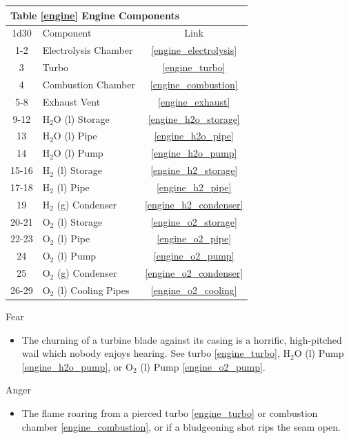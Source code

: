 \documentclass[a4paper]{article}
\begin{document}
\vspace{0.5cm} \hspace{0.25\linewidth}
\def\engine_components{
\begin{tabular}[t]{| c | l | c |}
\toprule
\multicolumn{3}{|l|}{Table \ref{engine} Engine Components} \\
\toprule
1d30 & Component & Link \\
\midrule
1-2 & Electrolysis Chamber & \ref{engine_electrolysis} \\
3 & Turbo & \ref{engine_turbo} \\
4 & Combustion Chamber & \ref{engine_combustion} \\
5-8 & Exhaust Vent & \ref{engine_exhaust} \\
\midrule
9-12 & H$_2$O (l) Storage & \ref{engine_h2o_storage} \\
13 & H$_2$O (l) Pipe & \ref{engine_h2o_pipe} \\
14 & H$_2$O (l) Pump & \ref{engine_h2o_pump} \\
15-16 & H$_2$ (l) Storage & \ref{engine_h2_storage} \\
17-18 & H$_2$ (l) Pipe & \ref{engine_h2_pipe} \\
19 & H$_2$ (g) Condenser & \ref{engine_h2_condenser} \\
20-21 & O$_2$ (l) Storage & \ref{engine_o2_storage} \\
22-23 & O$_2$ (l) Pipe & \ref{engine_o2_pipe} \\
24 & O$_2$ (l) Pump & \ref{engine_o2_pump} \\
25 & O$_2$ (g) Condenser & \ref{engine_o2_condenser} \\
26-29 & O$_2$ (l) Cooling Pipes & \ref{engine_o2_cooling} \\
\bottomrule
\end{tabular}
}
\engine_components

\vspace{0.3cm}
\begin{minipage}[t]{0.4\linewidth}
Fear
\begin{itemize}
\item The churning of a turbine blade against its casing is a horrific, high-pitched wail which nobody enjoys hearing. See turbo \ref{engine_turbo}, H$_2$O (l) Pump \ref{engine_h2o_pump}, or O$_2$ (l) Pump \ref{engine_o2_pump}.
\end{itemize}
\end{minipage} 
\begin{minipage}[t]{0.4\linewidth}
Anger
\begin{itemize}
\item The flame roaring from a pierced turbo \ref{engine_turbo} or combustion chamber \ref{engine_combustion}, or if a bludgeoning shot rips the seam open. 
\end{itemize}
\end{minipage}
\end{document}

